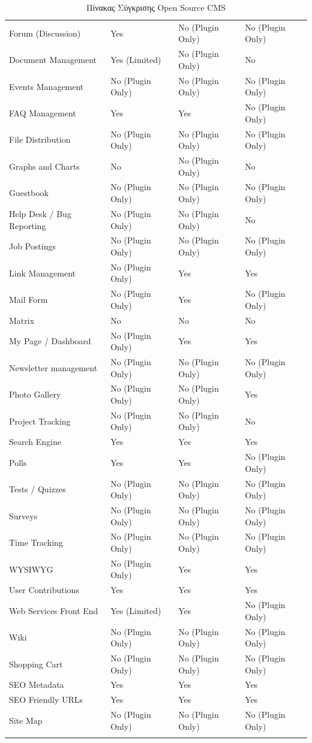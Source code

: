 \documentclass[12pt]{report}
\begin{document}
\begin{longtable}[H]{|| p{.3\linewidth} | p{.19\linewidth} | p{.19\linewidth} | p{.19\linewidth} ||}
Forum (Discussion) & Yes & No (Plugin Only) & No (Plugin Only) \\
Document Management & Yes (Limited) & No (Plugin Only) & No \\
Events Management & No (Plugin Only) & No (Plugin Only) & No (Plugin Only) \\
FAQ Management & Yes & Yes & No (Plugin Only) \\
File Distribution & No (Plugin Only) & No (Plugin Only) & No (Plugin Only) \\
Graphs and Charts & No & No (Plugin Only) & No \\
Guestbook & No (Plugin Only) & No (Plugin Only) & No (Plugin Only) \\
Help Desk / Bug Reporting & No (Plugin Only) & No (Plugin Only) & No \\
Job Postings & No (Plugin Only) & No (Plugin Only) & No (Plugin Only) \\
Link Management & No (Plugin Only) & Yes & Yes \\
Mail Form & No (Plugin Only) & Yes & No (Plugin Only) \\
Matrix & No & No & No \\
My Page / Dashboard & No (Plugin Only) & Yes & Yes \\
Newsletter management & No (Plugin Only) & No (Plugin Only) & No (Plugin Only) \\
Photo Gallery & No (Plugin Only) & No (Plugin Only) & Yes \\
Project Tracking & No (Plugin Only) & No (Plugin Only) & No \\
Search Engine & Yes & Yes & Yes \\
Polls & Yes & Yes & No (Plugin Only) \\
Tests / Quizzes & No (Plugin Only) & No (Plugin Only) & No (Plugin Only) \\
Surveys & No (Plugin Only) & No (Plugin Only) & No (Plugin Only) \\
Time Tracking & No (Plugin Only) & No (Plugin Only) & No (Plugin Only) \\
WYSIWYG & No (Plugin Only) & Yes & Yes \\
User Contributions & Yes & Yes & Yes \\
Web Services Front End & Yes (Limited) & Yes & No (Plugin Only) \\
Wiki & No (Plugin Only) & No (Plugin Only) & No (Plugin Only) \\
Shopping Cart & No (Plugin Only) & No (Plugin Only) & No (Plugin Only) \\
SEO Metadata & Yes & Yes & Yes \\
SEO Friendly URLs & Yes & Yes & Yes \\
Site Map & No (Plugin Only) & No (Plugin Only) & No (Plugin Only) \\
\hline
\caption{\textgreek{Πίνακας Σύγκρισης} Open Source CMS}
\label{tab01}
\end{longtable}
\normalsize
{}
\end{document}
